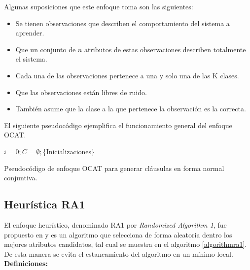 Algunas suposiciones que este enfoque toma son las siguientes:

\begin{itemize}
	\item Se tienen observaciones que describen el comportamiento del sistema a aprender.
	\item Que un conjunto de $n$ atributos de estas observaciones describen totalmente el sistema.
	\item Cada una de las observaciones pertenece a una y solo una de las K clases.
	\item Que las observaciones están libres de ruido.
	\item También asume que la clase a la que pertenece la observación es la correcta. 
\end{itemize}

El siguiente pseudocódigo ejemplifica el funcionamiento general del enfoque OCAT.
\\
\begin{algorithm}[H] 
	\SetAlgoLined
	$i = 0; C=\emptyset;$\{Inicializaciones\}\;
	
	\caption{Pseudocódigo de enfoque OCAT para generar cláusulas en forma normal conjuntiva.}
\end{algorithm}

\subsection{Heurística RA1}
El enfoque heurístico, denominado RA1 por \textit{Randomized Algorithm 1}, fue propuesto en \citep{DESHPANDE199875} y es un algoritmo que selecciona de forma aleatoria dentro los mejores atributos candidatos, tal cual se muestra en el algoritmo \ref{algorithmra1}. De esta manera se evita el estancamiento del algoritmo en un mínimo local. 
\\

\textbf{Definiciones:}

